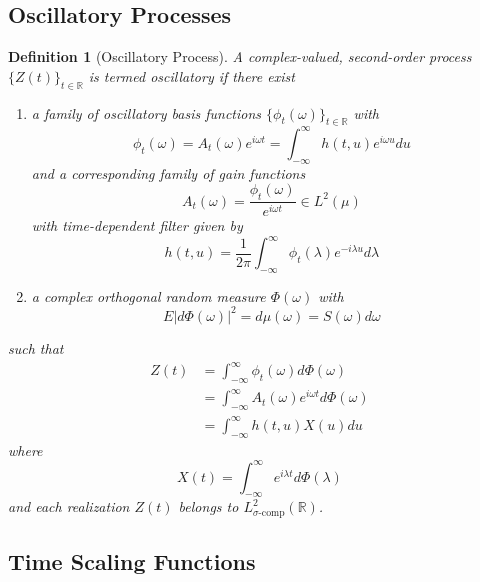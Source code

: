 \documentclass{article}
\newtheorem{definition}[theorem]{Definition}
\begin{document}
\subsection{Oscillatory Processes}

\begin{definition}[Oscillatory Process]\label{def:oscillatory}
A complex-valued, second-order process $\{Z(t)\}_{t \in \mathbb{R}}$ is termed \emph{oscillatory} if there exist
\begin{enumerate}
\item a family of oscillatory basis functions $\{\phi_t(\omega)\}_{t \in \mathbb{R}}$ with
\begin{equation}
\phi_t(\omega) = A_t(\omega) e^{i\omega t} = \int_{-\infty}^{\infty} h(t,u) e^{i\omega u} du
\end{equation}
and a corresponding family of gain functions
\begin{equation}
A_t(\omega) = \frac{\phi_t(\omega)}{e^{i\omega t}} \in L^2(\mu) \label{envelope}
\end{equation}
with time-dependent filter given by
\begin{equation}
h(t,u) = \frac{1}{2\pi} \int_{-\infty}^{\infty} \phi_t(\lambda) e^{-i\lambda u} d\lambda
\end{equation}
\item a complex orthogonal random measure $\Phi(\omega)$ with
\begin{equation}
E|d\Phi(\omega)|^2 = d\mu(\omega) = S(\omega) d\omega
\end{equation}
\end{enumerate}
such that
\begin{equation}
\label{eq:oscillatory_rep}
\begin{aligned}
Z(t) &= \int_{-\infty}^{\infty} \phi_t(\omega) d\Phi(\omega) \\
&= \int_{-\infty}^{\infty} A_t(\omega) e^{i\omega t} d\Phi(\omega) \\
&= \int_{-\infty}^{\infty} h(t,u) X(u) du
\end{aligned}
\end{equation}
where
\begin{equation}
X(t) = \int_{-\infty}^{\infty} e^{i\lambda t} d\Phi(\lambda)
\end{equation}
and each realization $Z(t)$ belongs to $L^2_{\sigma\text{-comp}}(\mathbb{R})$.
\end{definition}

\subsection{Time Scaling Functions}
\end{document}
